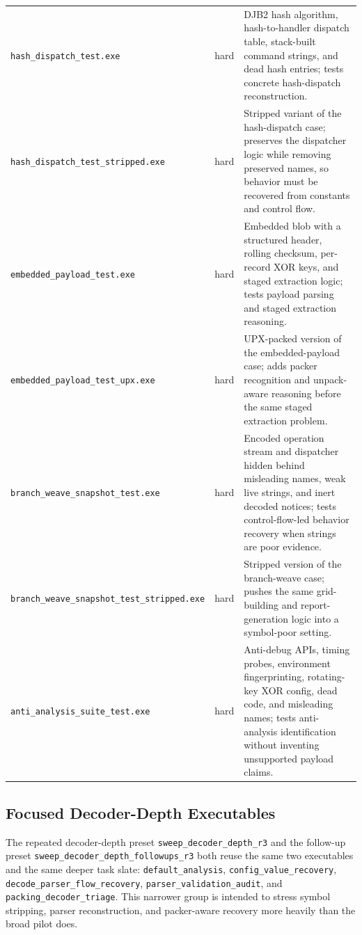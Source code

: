 \begin{longtable}{p{} p{} p{}}
\texttt{hash\_dispatch\_test.exe} & hard & DJB2 hash algorithm, hash-to-handler dispatch table, stack-built command strings, and dead hash entries; tests concrete hash-dispatch reconstruction. \\
\texttt{hash\_dispatch\_test\_stripped.exe} & hard & Stripped variant of the hash-dispatch case; preserves the dispatcher logic while removing preserved names, so behavior must be recovered from constants and control flow. \\
\texttt{embedded\_payload\_test.exe} & hard & Embedded blob with a structured header, rolling checksum, per-record XOR keys, and staged extraction logic; tests payload parsing and staged extraction reasoning. \\
\texttt{embedded\_payload\_test\_upx.exe} & hard & UPX-packed version of the embedded-payload case; adds packer recognition and unpack-aware reasoning before the same staged extraction problem. \\
\texttt{branch\_weave\_snapshot\_test.exe} & hard & Encoded operation stream and dispatcher hidden behind misleading names, weak live strings, and inert decoded notices; tests control-flow-led behavior recovery when strings are poor evidence. \\
\texttt{branch\_weave\_snapshot\_test\_stripped.exe} & hard & Stripped version of the branch-weave case; pushes the same grid-building and report-generation logic into a symbol-poor setting. \\
\texttt{anti\_analysis\_suite\_test.exe} & hard & Anti-debug APIs, timing probes, environment fingerprinting, rotating-key XOR config, dead code, and misleading names; tests anti-analysis identification without inventing unsupported payload claims. \\
\hline
\end{longtable}
\normalsize

\subsection{Focused Decoder-Depth Executables}

The repeated decoder-depth preset \texttt{sweep\_decoder\_depth\_r3} and the follow-up preset \texttt{sweep\_decoder\_depth\_followups\_r3} both reuse the same two executables and the same deeper task slate: \texttt{default\_analysis}, \texttt{config\_value\_recovery}, \texttt{decode\_parser\_flow\_recovery}, \texttt{parser\_validation\_audit}, and \texttt{packing\_decoder\_triage}. This narrower group is intended to stress symbol stripping, parser reconstruction, and packer-aware recovery more heavily than the broad pilot does.

